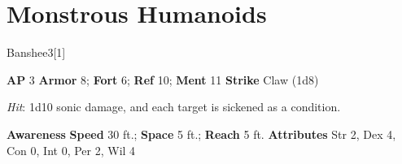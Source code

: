 \section{Monstrous Humanoids}
\begin{monsection}{Banshee}{3}[1]
\vspace{-1em}\vspace{-1em}
\begin{spellcontent}
\begin{spelltargetinginfo}
{\textbf{AP} 3}
\pari \textbf{Armor} 8;
\textbf{Fort} 6;
\textbf{Ref} 10;
\textbf{Ment} 11
\pari \textbf{Strike} Claw  (1d8)
\end{spelltargetinginfo}
\begin{spelleffects}
\pari
{}
\par
\par \textit{Hit}: 1d10 sonic damage, and each target is sickened as a condition.
\end{spelleffects}
\end{spellcontent}
\begin{spellsubcontent}
\begin{spellfooter}
\pari \textbf{Awareness} 
\pari \textbf{Speed} 30 ft.;
\textbf{Space} 5 ft.;
\textbf{Reach} 5 ft.
\pari \textbf{Attributes}
Str 2,
Dex 4,
Con 0,
Int 0,
Per 2,
Wil 4
\end{spellfooter}
\end{spellsubcontent}
\end{monsection}
